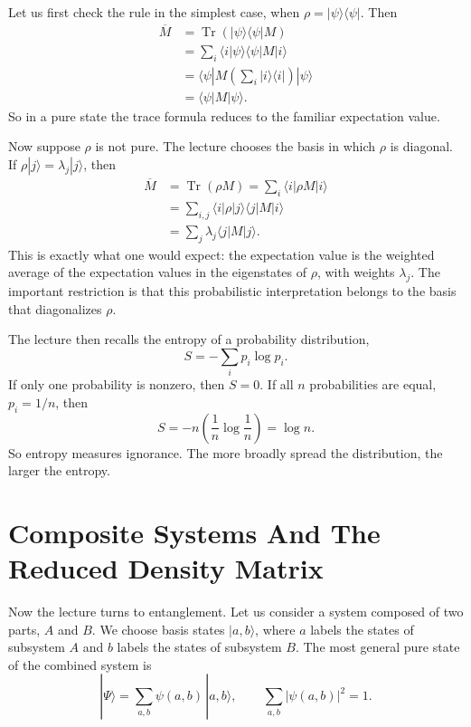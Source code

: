 Let us first check the rule in the simplest case, when \(\rho = |\psi\rangle\langle\psi|\). Then
\begin{align}
\overline{M}
&= \operatorname{Tr}(|\psi\rangle\langle\psi|M) \\
&= \sum_i \langle i|\psi\rangle\langle\psi|M|i\rangle \\
&= \langle\psi|M\left(\sum_i |i\rangle\langle i|\right)|\psi\rangle \\
&= \langle\psi|M|\psi\rangle.
\end{align}
So in a pure state the trace formula reduces to the familiar expectation value.

Now suppose \(\rho\) is not pure. The lecture chooses the basis in which \(\rho\) is diagonal. If \(\rho|j\rangle = \lambda_j |j\rangle\), then
\begin{align}
\overline{M}
&= \operatorname{Tr}(\rho M)
= \sum_i \langle i|\rho M|i\rangle \\
&= \sum_{i,j} \langle i|\rho|j\rangle \langle j|M|i\rangle \\
&= \sum_j \lambda_j \langle j|M|j\rangle.
\end{align}
This is exactly what one would expect: the expectation value is the weighted average of the expectation values in the eigenstates of \(\rho\), with weights \(\lambda_j\). The important restriction is that this probabilistic interpretation belongs to the basis that diagonalizes \(\rho\).

The lecture then recalls the entropy of a probability distribution,
\begin{equation}
S = - \sum_i p_i \log p_i.
\end{equation}
If only one probability is nonzero, then \(S=0\). If all \(n\) probabilities are equal, \(p_i=1/n\), then
\begin{equation}
S = - n \left(\frac{1}{n}\log\frac{1}{n}\right) = \log n.
\end{equation}
So entropy measures ignorance. The more broadly spread the distribution, the larger the entropy.

\section{Composite Systems And The Reduced Density Matrix}

Now the lecture turns to entanglement. Let us consider a system composed of two parts, \(A\) and \(B\). We choose basis states \(|a,b\rangle\), where \(a\) labels the states of subsystem \(A\) and \(b\) labels the states of subsystem \(B\). The most general pure state of the combined system is
\begin{equation}
|\Psi\rangle = \sum_{a,b} \psi(a,b)\,|a,b\rangle,
\qquad
\sum_{a,b} |\psi(a,b)|^2 = 1.
\end{equation}

